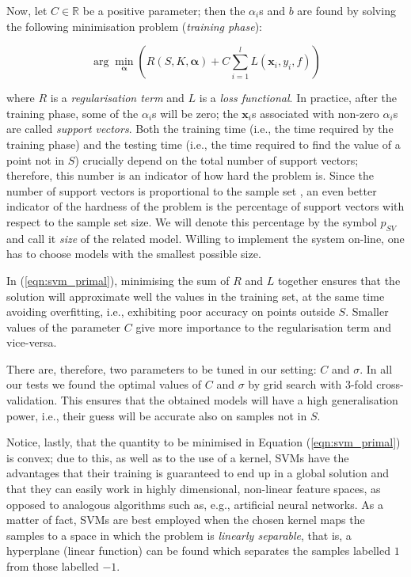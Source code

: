 \documentclass[jou,a4paper,notxfonts]{apa}
\def\RR{\mathbb{R}}
\def\xx{\mathbf{x}}
\def\aa{\boldsymbol{\alpha}}
\begin{document}
Now, let $C \in \RR$ be a positive parameter; then the $\alpha_i$s and
$b$ are found by solving the following minimisation problem
(\emph{training phase}):

\begin{equation} \label{eqn:svm_primal}
  \arg \min_{\aa} \left( R(S,K,\aa) + C \sum_{i=1}^l L(\xx_i,y_i,f) \right)
\end{equation}

\noindent where $R$ is a \emph{regularisation term} and $L$ is a
\emph{loss functional}. In practice, after the training phase, some of
the $\alpha_i$s will be zero; the $\xx_i$s associated with non-zero
$\alpha_i$s are called \emph{support vectors}. Both the training time
(i.e., the time required by the training phase) and the testing time
(i.e., the time required to find the value of a point not in $S$)
crucially depend on the total number of support vectors; therefore,
this number is an indicator of how hard the problem is. Since the
number of support vectors is proportional to the sample set
\cite{Steinwart03}, an even better indicator of the hardness of the
problem is the percentage of support vectors with respect to the
sample set size. We will denote this percentage by the symbol $p_{SV}$
and call it \emph{size} of the related model. Willing to implement the
system on-line, one has to choose models with the smallest possible
size.

In (\ref{eqn:svm_primal}), minimising the sum of $R$ and $L$ together
ensures that the solution will approximate well the values in the
training set, at the same time avoiding overfitting, i.e., exhibiting
poor accuracy on points outside $S$. Smaller values of the parameter
$C$ give more importance to the regularisation term and vice-versa.

There are, therefore, two parameters to be tuned in our setting: $C$
and $\sigma$. In all our tests we found the optimal values of $C$ and
$\sigma$ by grid search with $3$-fold cross-validation. This ensures
that the obtained models will have a high generalisation power, i.e.,
their guess will be accurate also on samples not in $S$.

Notice, lastly, that the quantity to be minimised in Equation
(\ref{eqn:svm_primal}) is convex; due to this, as well as to the use
of a kernel, SVMs have the advantages that their training is
guaranteed to end up in a global solution and that they can easily
work in highly dimensional, non-linear feature spaces, as opposed to
analogous algorithms such as, e.g., artificial neural networks. As a
matter of fact, SVMs are best employed when the chosen kernel maps the
samples to a space in which the problem is \emph{linearly separable},
that is, a hyperplane (linear function) can be found which separates
the samples labelled $1$ from those labelled $-1$.
\end{document}
